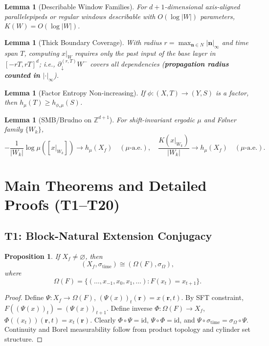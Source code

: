 \documentclass[11pt]{article}
\newtheorem{lemma}[theorem]{Lemma}
\newtheorem{proposition}[theorem]{Proposition}
\theoremstyle{definition}
\theoremstyle{remark}
\begin{document}
\begin{lemma}[Describable Window Families]\label{lem:5.2}
For \( d+1 \)-dimensional axis-aligned parallelepipeds or regular windows describable with \( O(\log |W|) \) parameters, \( K(W) = O(\log |W|) \).
\end{lemma}

\begin{lemma}[Thick Boundary Coverage]\label{lem:5.3}
With radius \( r = \max_{\mathbf{n} \in N} |\mathbf{n}|_\infty \) and time span \( T \), computing \( x|_W \) requires only the past input of the base layer in \( [-rT, rT]^d \); i.e., \( \partial_\downarrow^{(r,T)} W^- \) covers all dependencies (\textbf{propagation radius counted in \( |\cdot|_\infty \)}).
\end{lemma}

\begin{lemma}[Factor Entropy Non-increasing]\label{lem:5.4}
If \( \phi: (X, T) \to (Y, S) \) is a factor, then \( h_\mu(T) \geq h_{\phi_* \mu}(S) \).
\end{lemma}

\begin{lemma}[SMB/Brudno on \( \mathbb{Z}^{d+1} \)]\label{lem:5.5}
For shift-invariant ergodic \( \mu \) and Følner family \( \{W_k\} \),
\[
-\frac{1}{|W_k|} \log \mu([x|_{W_k}]) \to h_\mu(X_f) \quad (\mu\text{-a.e.}), \quad \frac{K(x|_{W_k})}{|W_k|} \to h_\mu(X_f) \quad (\mu\text{-a.e.}).
\]
\end{lemma}

\section{Main Theorems and Detailed Proofs (T1--T20)}

\subsection{T1: Block-Natural Extension Conjugacy}

\begin{proposition}\label{thm:T1}
If \( X_f \neq \varnothing \), then
\[
\boxed{(X_f, \sigma_{\mathrm{time}}) \cong (\Omega(F), \sigma_\Omega)},
\]
where
\[
\Omega(F) = \{(\ldots, x_{-1}, x_0, x_1, \ldots) : F(x_t) = x_{t+1}\}.
\]
\end{proposition}

\begin{proof}
Define \( \Psi: X_f \to \Omega(F) \), \( (\Psi(x))_t(\mathbf{r}) = x(\mathbf{r}, t) \). By SFT constraint, \( F((\Psi(x))_t) = (\Psi(x))_{t+1} \). Define inverse \( \Phi: \Omega(F) \to X_f \), \( \Phi((x_t))(\mathbf{r}, t) = x_t(\mathbf{r}) \). Clearly \( \Phi \circ \Psi = \mathrm{id} \), \( \Psi \circ \Phi = \mathrm{id} \), and \( \Psi \circ \sigma_{\mathrm{time}} = \sigma_\Omega \circ \Psi \). Continuity and Borel measurability follow from product topology and cylinder set structure.
\end{proof}
\end{document}
